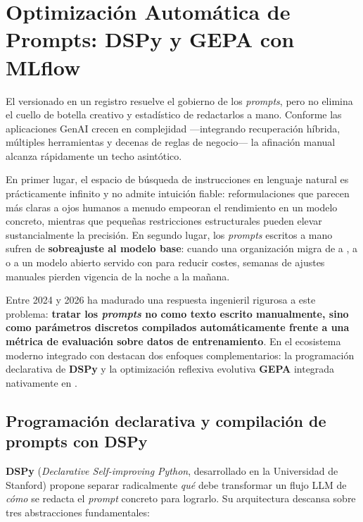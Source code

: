 \section[Optimización Automática: DSPy y GEPA]{Optimización Automática de Prompts: DSPy y GEPA con MLflow}\label{sec:prompt-optimization}

El versionado en un registro resuelve el gobierno de los \textit{prompts}, pero no elimina el cuello de botella creativo y estadístico de redactarlos a mano. Conforme las aplicaciones GenAI crecen en complejidad ---integrando recuperación híbrida, múltiples herramientas y decenas de reglas de negocio--- la afinación manual alcanza rápidamente un techo asintótico.

En primer lugar, el espacio de búsqueda de instrucciones en lenguaje natural es prácticamente infinito y no admite intuición fiable: reformulaciones que parecen más claras a ojos humanos a menudo empeoran el rendimiento en un modelo concreto, mientras que pequeñas restricciones estructurales pueden elevar sustancialmente la precisión. En segundo lugar, los \textit{prompts} escritos a mano sufren de \textbf{sobreajuste al modelo base}: cuando una organización migra de  a , a  o a un modelo abierto servido con  para reducir costes, semanas de ajustes manuales pierden vigencia de la noche a la mañana.

Entre 2024 y 2026 ha madurado una respuesta ingenieril rigurosa a este problema: \textbf{tratar los \textit{prompts} no como texto escrito manualmente, sino como parámetros discretos compilados automáticamente frente a una métrica de evaluación sobre datos de entrenamiento}. En el ecosistema moderno integrado con  destacan dos enfoques complementarios: la programación declarativa de \textbf{DSPy} y la optimización reflexiva evolutiva \textbf{GEPA} integrada nativamente en .

\subsection{Programación declarativa y compilación de prompts con DSPy}\label{subsec:dspy-mlflow}

\textbf{DSPy} (\textit{Declarative Self-improving Python}, desarrollado en la Universidad de Stanford) propone separar radicalmente \emph{qué} debe transformar un flujo LLM de \emph{cómo} se redacta el \textit{prompt} concreto para lograrlo. Su arquitectura descansa sobre tres abstracciones fundamentales:

